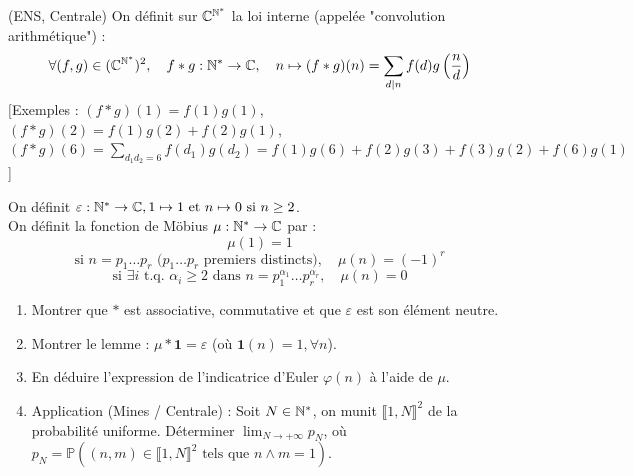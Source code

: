 
\begin{statementbox}
(ENS, Centrale) On définit sur $\mathbb{C}^{\mathbb N^*}$ la loi interne (appelée "convolution arithmétique") :
\[ \forall (f,g) \in (\mathbb{C}^{\mathbb N^*})^2, \quad f * g : \mathbb N^* \to \mathbb{C}, \quad n \mapsto (f*g)(n) = \sum_{d \mid n} f(d) g\left(\frac{n}{d}\right) \]
$\big[$Exemples : $(f*g)(1) = f(1)g(1)$, $(f*g)(2) = f(1)g(2) + f(2)g(1)$, $(f*g)(6) = \sum_{d_1 d_2 = 6} f(d_1) g(d_2) = f(1)g(6) + f(2)g(3) + f(3)g(2) + f(6)g(1)$\big]

On définit $\varepsilon : \mathbb N^* \to \mathbb{C}, 1 \mapsto 1 \text{ et } n \mapsto 0 \text{ si } n \geq 2$. \\
On définit la fonction de Möbius $\mu : \mathbb N^* \to \mathbb{C}$ par :
\[ \mu(1) = 1 \]
\[ \text{si } n = p_1 \dots p_r \text{ ($p_1 \dots p_r$ premiers distincts)}, \quad \mu(n) = (-1)^r \]
\[ \text{si } \exists i \text{ t.q. } \alpha_i \geq 2 \text{ dans } n = p_1^{\alpha_1} \dots p_r^{\alpha_r}, \quad \mu(n) = 0 \]
\begin{enumerate}
  \item Montrer que $*$ est associative, commutative et que $\varepsilon$ est son élément neutre.
  \item Montrer le lemme : $\mu * \mathbf{1} = \varepsilon$ (où $\mathbf{1}(n) = 1, \forall n$).
  \item En déduire l'expression de l'indicatrice d'Euler $\varphi(n)$ à l'aide de $\mu$.
  \item Application (Mines / Centrale) : Soit $N \in \mathbb N^*$, on munit $\llbracket 1, N \rrbracket^2$ de la probabilité uniforme.
  Déterminer $\lim_{N \to +\infty} p_N$, où $p_N = \mathbb{P}((n,m) \in \llbracket 1, N \rrbracket^2 \text{ tels que } n \wedge m = 1)$.
\end{enumerate}
\end{statementbox}

